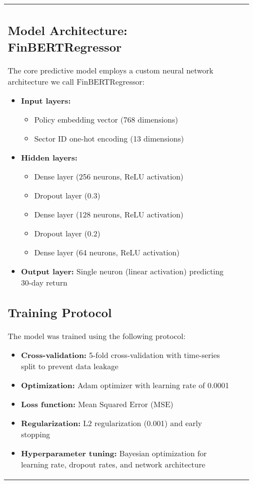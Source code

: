 \documentclass{article} \usepackage[utf8]{inputenc} \usepackage{graphicx} \usepackage{xcolor} \usepackage{titlesec} \usepackage{booktabs} \usepackage{multicol} \usepackage{amsmath} \usepackage{amssymb} \usepackage{enumitem} \usepackage{hyperref} \usepackage{float} \usepackage[margin=1in]{geometry} \usepackage{fancyhdr} \usepackage{tikz} \usepackage{pgfplots}
\begin{document}
\begin{table}[h]
\begin{tabular}{lcl}
{\subsection{Model Architecture: FinBERTRegressor}

The core predictive model employs a custom neural network architecture we call FinBERTRegressor:

\begin{itemize} \item \textbf{Input layers:} \begin{itemize} \item Policy embedding vector (768 dimensions) \item Sector ID one-hot encoding (13 dimensions) \end{itemize} \item \textbf{Hidden layers:} \begin{itemize} \item Dense layer (256 neurons, ReLU activation) \item Dropout layer (0.3) \item Dense layer (128 neurons, ReLU activation) \item Dropout layer (0.2) \item Dense layer (64 neurons, ReLU activation) \end{itemize} \item \textbf{Output layer:} Single neuron (linear activation) predicting 30-day return \end{itemize}

\subsection{Training Protocol}

The model was trained using the following protocol:

\begin{itemize} \item \textbf{Cross-validation:} 5-fold cross-validation with time-series split to prevent data leakage \item \textbf{Optimization:} Adam optimizer with learning rate of 0.0001 \item \textbf{Loss function:} Mean Squared Error (MSE) \item \textbf{Regularization:} L2 regularization (0.001) and early stopping \item \textbf{Hyperparameter tuning:} Bayesian optimization for learning rate, dropout rates, and network architecture \end{itemize}

}
\end{tabular}
\end{table}
\end{document}
